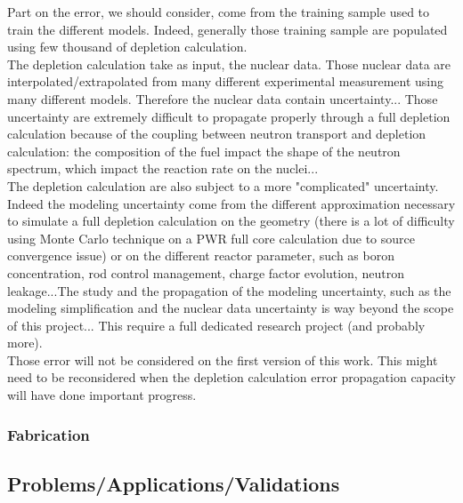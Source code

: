 \documentclass[dvips,12pt]{article}
\begin{document}
Part on the error, we should consider, come from the training sample used to train the different models. Indeed, generally those training sample are populated using few thousand of depletion calculation.\\
The depletion calculation take as input, the nuclear data. Those nuclear data are interpolated/extrapolated from many different experimental measurement using many different models. Therefore the nuclear data contain uncertainty...
Those uncertainty are extremely difficult to propagate properly through a full depletion calculation because of the coupling between neutron transport and depletion calculation: the composition of the fuel impact the shape of the neutron spectrum, which impact the reaction rate on the nuclei...\\
The depletion calculation are also subject to a more "complicated" uncertainty. Indeed the modeling uncertainty come from the different approximation necessary to simulate a full depletion calculation on the geometry (there is a lot of difficulty using Monte Carlo technique on a PWR full core calculation due to source convergence issue) or on the different reactor parameter, such as boron concentration, rod control management, charge factor evolution, neutron leakage...The study and the propagation of the modeling uncertainty, such as the modeling simplification and the nuclear data uncertainty is way beyond the scope of this project... This require a full dedicated research project (and probably more).\\
Those error will not be considered on the first version of this work. This might need to be reconsidered when the depletion calculation error propagation capacity will have done important progress.\\





  


\subsubsection{Fabrication} \label{sec:fabrication}

\subsection{Problems/Applications/Validations}
\end{document}
